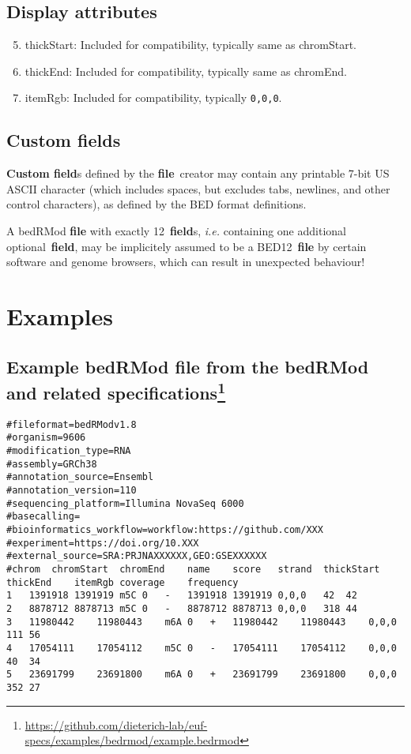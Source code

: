 \documentclass[11pt]{article}
\begin{document}
\subsection{Display attributes}
\begin{enumerate}
  \setcounter{enumi}{4}

\item \textsf{thickStart}: Included for compatibility, typically same as \textsf{chromStart}.

\item \textsf{thickEnd}: Included for compatibility, typically same as \textsf{chromEnd}.

\item \textsf{itemRgb}: Included for compatibility, typically \texttt{0,0,0}.

\end{enumerate}

\subsection{Custom fields}\label{sec:custom_fields}

\textbf{Custom field}s defined by the \textbf{file}~creator may contain any printable 7-bit US \ac{ASCII} character (which includes spaces, but excludes tabs, newlines, and other control characters), as defined by the \ac{BED} format definitions.

A \acs{bedRMod} \textbf{file} with exactly 12~\textbf{field}s, \textit{i.e.} containing one additional optional~\textbf{field}, may be implicitely 
assumed to be a BED12~\textbf{file} by certain software and genome browsers, which can result in unexpected behaviour! 

\section{Examples}

\subsection[title]{Example bedRMod file from the \acs{bedRMod} and related specifications\footnote{\url{https://github.com/dieterich-lab/euf-specs/examples/bedrmod/example.bedrmod}}}\label{sec:example-bedrmod}

\begin{verbatim}
#fileformat=bedRModv1.8
#organism=9606
#modification_type=RNA
#assembly=GRCh38
#annotation_source=Ensembl
#annotation_version=110
#sequencing_platform=Illumina NovaSeq 6000
#basecalling=
#bioinformatics_workflow=workflow:https://github.com/XXX
#experiment=https://doi.org/10.XXX
#external_source=SRA:PRJNAXXXXXX,GEO:GSEXXXXXX
#chrom	chromStart	chromEnd	name	score	strand	thickStart	thickEnd	itemRgb	coverage	frequency
1	1391918	1391919	m5C	0	-	1391918	1391919	0,0,0	42	42
2	8878712	8878713	m5C	0	-	8878712	8878713	0,0,0	318	44
3	11980442	11980443	m6A	0	+	11980442	11980443	0,0,0	111	56
4	17054111	17054112	m5C	0	-	17054111	17054112	0,0,0	40	34
5	23691799	23691800	m6A	0	+	23691799	23691800	0,0,0	352	27
\end{verbatim}
\end{document}
